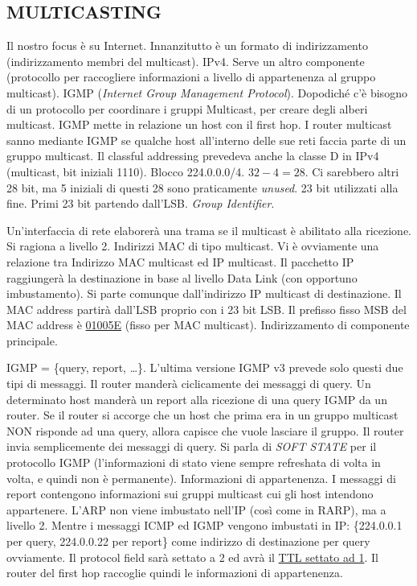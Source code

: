 \subsection{MULTICASTING}

Il nostro focus è su Internet. Innanzitutto è un formato di indirizzamento (indirizzamento membri del multicast). IPv4. Serve un altro componente (protocollo per raccogliere informazioni a livello di appartenenza al gruppo multicast). IGMP (\textit{Internet Group Management Protocol}). Dopodiché c'è bisogno di un protocollo per coordinare i gruppi Multicast, per creare degli alberi multicast. IGMP mette in relazione un host con il first hop. I router multicast sanno mediante IGMP se qualche host all'interno delle sue reti faccia parte di un gruppo multicast. Il classful addressing prevedeva anche la classe D in IPv4 (multicast, bit iniziali 1110). Blocco 224.0.0.0/4. $32-4=28$. Ci sarebbero altri 28 bit, ma 5 iniziali di questi 28 sono praticamente \textit{unused}. 23 bit utilizzati alla fine. Primi 23 bit partendo dall'LSB. \textit{Group Identifier}.

Un'interfaccia di rete elaborerà una trama se il multicast è abilitato alla ricezione. Si ragiona a livello 2. Indirizzi MAC di tipo multicast. Vi è ovviamente una relazione tra Indirizzo MAC multicast ed IP multicast. Il pacchetto IP raggiungerà la destinazione in base al livello Data Link (con opportuno imbustamento). Si parte comunque dall'indirizzo IP multicast di destinazione. Il MAC address partirà dall'LSB proprio con i 23 bit LSB. Il prefisso fisso MSB del MAC address è \underline{01005E} (fisso per MAC multicast). Indirizzamento di componente principale.

IGMP = \{query, report, \dots\}. L'ultima versione IGMP v3 prevede solo questi due tipi di messaggi. Il router manderà ciclicamente dei messaggi di query. Un determinato host manderà un report alla ricezione di una query IGMP da un router.
Se il router si accorge che un host che prima era in un gruppo multicast NON risponde ad una query, allora capisce che vuole lasciare il gruppo. Il router invia semplicemente dei messaggi di query. Si parla di \textit{SOFT STATE} per il protocollo IGMP (l'informazioni di stato viene sempre refreshata di volta in volta, e quindi non è permanente). Informazioni di appartenenza. I messaggi di report contengono informazioni sui gruppi multicast cui gli host intendono appartenere. L'ARP non viene imbustato nell'IP (così come in RARP), ma a livello 2. Mentre i messaggi ICMP ed IGMP vengono imbustati in IP: \{224.0.0.1 per query, 224.0.0.22 per report\} come indirizzo di destinazione per query ovviamente. Il protocol field sarà settato a 2 ed avrà il \underline{TTL settato ad 1}. Il router del first hop raccoglie quindi le informazioni di appartenenza. 

